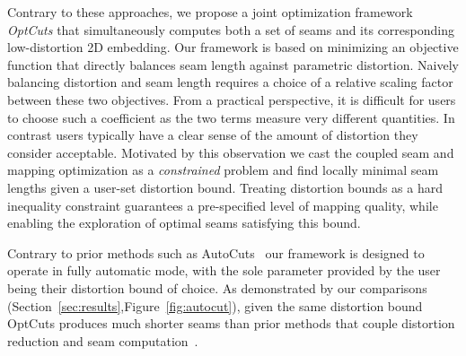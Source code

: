 Contrary to these approaches, we propose a joint optimization framework {\em OptCuts} that simultaneously computes  both a set of seams and its corresponding low-distortion 2D embedding.
Our framework is based on minimizing an objective function that directly balances seam length against parametric distortion. Naively balancing distortion and seam length requires a choice of a relative scaling factor between these two objectives.  From a practical perspective, it is difficult for users to choose such a coefficient as the two terms measure very different quantities. 
In contrast users typically have a clear sense of the amount of distortion they consider acceptable. Motivated by this observation we cast the coupled seam and mapping optimization as a \emph{constrained} problem and find locally minimal seam lengths given a user-set distortion bound. Treating distortion bounds as a hard inequality constraint guarantees a pre-specified level of mapping quality, while enabling the exploration of optimal seams satisfying this bound. %

Contrary to prior methods such as AutoCuts~\cite{Poranne2017Autocuts} our framework is designed to operate in fully automatic mode, with the sole parameter provided by the user being their distortion bound of choice. As demonstrated by our comparisons  (Section~\ref{sec:results},Figure~\ref{fig:autocut}), given the same distortion bound  OptCuts produces much shorter seams than prior methods that couple distortion reduction and seam computation~\cite{BoundedDistortParam:2002,Poranne2017Autocuts}. 
  

